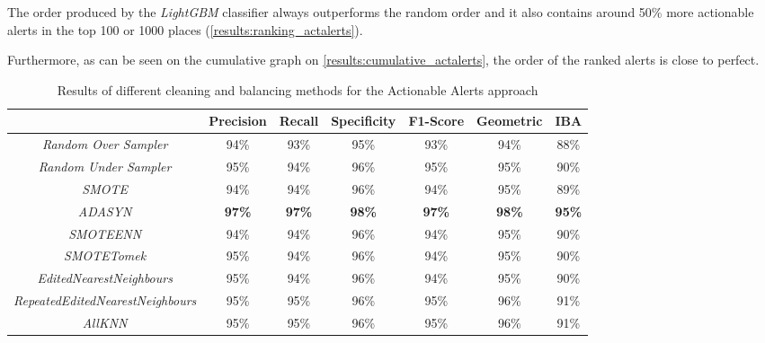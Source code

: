 The order produced by the \textit{LightGBM} classifier always outperforms the random order and it also contains around 50\% more actionable alerts in the top 100 or 1000 places (\cref{results:ranking_actalerts}).

Furthermore, as can be seen on the cumulative graph on \cref{results:cumulative_actalerts}, the order of the ranked alerts is close to perfect.

\begin{table}[H]
	\caption{Results of different cleaning and balancing methods for the Actionable Alerts approach}
	\label{result:actalerts}
	\centering
	\begin{tabular}{@{}ccccccc@{}}
		\toprule
		& \textbf{Precision} & \textbf{Recall} & \textbf{Specificity} & \textbf{F1-Score} & \textbf{Geometric} & \textbf{IBA}  \\ \midrule
		\textit{Random Over Sampler}             & 94\%               & 93\%            & 95\%                 & 93\%              & 94\%               & 88\%          \\
		\textit{Random Under Sampler}            & 95\%               & 94\%            & 96\%                 & 95\%              & 95\%               & 90\%          \\
		\textit{SMOTE}                           & 94\%               & 94\%            & 96\%                 & 94\%              & 95\%               & 89\%          \\
		\textit{ADASYN}                          & \textbf{97\%}      & \textbf{97\%}   & \textbf{98\%}        & \textbf{97\%}     & \textbf{98\%}      & \textbf{95\%} \\
		\textit{SMOTEENN}                        & 94\%               & 94\%            & 96\%                 & 94\%              & 95\%               & 90\%          \\
		\textit{SMOTETomek}                      & 95\%               & 94\%            & 96\%                 & 94\%              & 95\%               & 90\%          \\
		\textit{EditedNearestNeighbours}         & 95\%               & 94\%            & 96\%                 & 94\%              & 95\%               & 90\%          \\
		\textit{RepeatedEditedNearestNeighbours} & 95\%               & 95\%            & 96\%                 & 95\%              & 96\%               & 91\%          \\
		\textit{AllKNN}                          & 95\%               & 95\%            & 96\%                 & 95\%              & 96\%               & 91\%          \\

\end{tabular}
\end{table}
